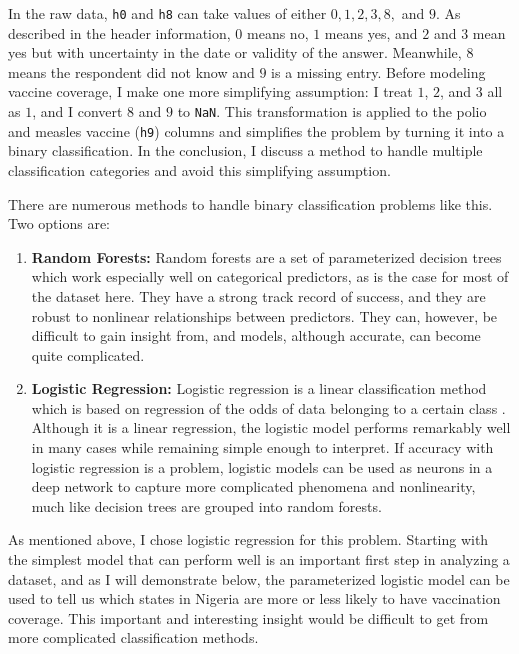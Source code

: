 \documentclass[prl,onecolumn,amsmath,amssymb,superscriptaddress,notitlepage]{revtex4-1}
\begin{document}
In the raw data, \verb|h0| and \verb|h8| can take values of either $0, 1, 2, 3, 8,$ and $9$. As described in the header information, $0$ means no, $1$ means yes, and $2$ and $3$ mean yes but with uncertainty in the date or validity of the answer. Meanwhile, $8$ means the respondent did not know and $9$ is a missing entry. Before modeling vaccine coverage, I make one more simplifying assumption: I treat $1$, $2$, and $3$ all as $1$, and I convert $8$ and $9$ to \verb|NaN|. This transformation is applied to the polio and measles vaccine (\verb|h9|) columns and simplifies the problem by turning it into a binary classification. In the conclusion, I discuss a method to handle multiple classification categories and avoid this simplifying assumption.

There are numerous methods to handle binary classification problems like this. Two options are:
\begin{enumerate}
\item \textbf{Random Forests:} Random forests are a set of parameterized decision trees \cite{breiman2001,kuhn2013} which work especially well on categorical predictors, as is the case for most of the dataset here. They have a strong track record of success, and they are robust to nonlinear relationships between predictors. They can, however, be difficult to gain insight from, and models, although accurate, can become quite complicated.

\item \textbf{Logistic Regression:} Logistic regression is a linear classification method which is based on regression of the odds of data belonging to a certain class \cite{downey2014,hastie2011}. Although it is a linear regression, the logistic model performs remarkably well in many cases while remaining simple enough to interpret. If accuracy with logistic regression is a problem, logistic models can be used as neurons in a deep network to capture more complicated phenomena and nonlinearity, much like decision trees are grouped into random forests. 
\end{enumerate}

As mentioned above, I chose logistic regression for this problem. Starting with the simplest model that can perform well is an important first step in analyzing a dataset, and as I will demonstrate below, the parameterized logistic model can be used to tell us which states in Nigeria are more or less likely to have vaccination coverage. This important and interesting insight would be difficult to get from more complicated classification methods.
\end{document}
